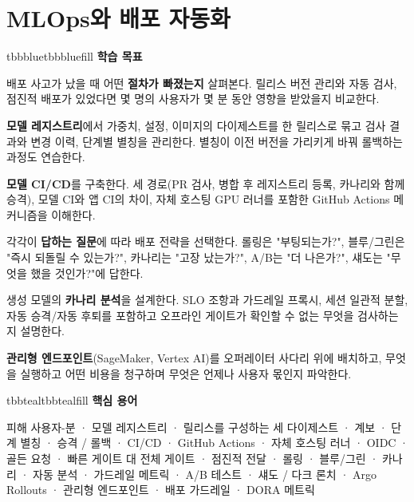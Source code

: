 \setcounter{chapter}{12}
\chapter{MLOps와 배포 자동화}

\begin{calloutbox}{tbbblue}{tbbbluefill}
{\normalsize\bfseries\color{tbbblue}학습 목표}\par\vspace{3pt}
\begin{tbbitemize}
  \item 배포 사고가 났을 때 어떤 \textbf{절차가 빠졌는지} 살펴본다. 릴리스 버전 관리와 자동 검사, 점진적 배포가 있었다면 몇 명의 사용자가 몇 분 동안 영향을 받았을지 비교한다.
  \item \textbf{모델 레지스트리}에서 가중치, 설정, 이미지의 다이제스트를 한 릴리스로 묶고 검사 결과와 변경 이력, 단계별 별칭을 관리한다. 별칭이 이전 버전을 가리키게 바꿔 롤백하는 과정도 연습한다.
  \item \textbf{모델 CI/CD}를 구축한다. 세 경로(PR 검사, 병합 후 레지스트리 등록, 카나리와 함께 승격), 모델 CI와 앱 CI의 차이, 자체 호스팅 GPU 러너를 포함한 GitHub Actions 메커니즘을 이해한다.
  \item 각각이 \textbf{답하는 질문}에 따라 배포 전략을 선택한다. 롤링은 "부팅되는가?", 블루/그린은 "즉시 되돌릴 수 있는가?", 카나리는 "고장 났는가?", A/B는 "더 나은가?", 섀도는 "무엇을 했을 것인가?"에 답한다.
  \item 생성 모델의 \textbf{카나리 분석}을 설계한다. SLO 조항과 가드레일 프록시, 세션 일관적 분할, 자동 승격/자동 후퇴를 포함하고 오프라인 게이트가 확인할 수 없는 무엇을 검사하는지 설명한다.
  \item \textbf{관리형 엔드포인트}(SageMaker, Vertex AI)를 오퍼레이터 사다리 위에 배치하고, 무엇을 실행하고 어떤 비용을 청구하며 무엇은 언제나 사용자 몫인지 파악한다.
\end{tbbitemize}
\end{calloutbox}

\vspace{2.5pt}

\begin{calloutbox}{tbbteal}{tbbtealfill}
{\normalsize\bfseries\color{tbbteal}핵심 용어}\par\vspace{3pt}
피해 사용자-분 · 모델 레지스트리 · 릴리스를 구성하는 세 다이제스트 · 계보 · 단계 별칭 · 승격 / 롤백 · CI/CD · GitHub Actions · 자체 호스팅 러너 · OIDC · 골든 요청 · 빠른 게이트 대 전체 게이트 · 점진적 전달 · 롤링 · 블루/그린 · 카나리 · 자동 분석 · 가드레일 메트릭 · A/B 테스트 · 섀도 / 다크 론치 · Argo Rollouts · 관리형 엔드포인트 · 배포 가드레일 · DORA 메트릭
\end{calloutbox}

